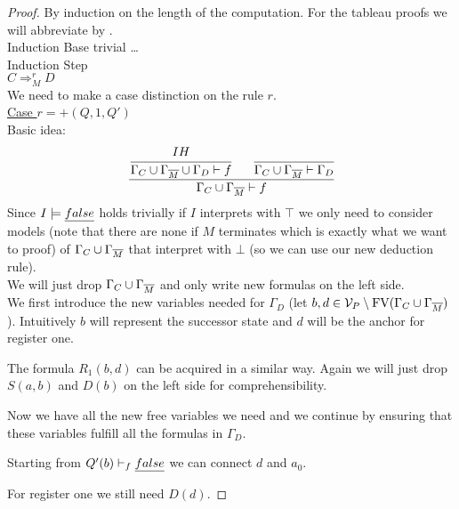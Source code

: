 \begin{proof} By induction on the length of the computation.
	For the tableau proofs we will abbreviate \false{} by \falses.\\
	Induction Base trivial \dots\\
	Induction Step\\
	$C\Rightarrow_M^r D$\\
	We need to make a case distinction on the rule $r$.\\
	\underline{Case $r=+(Q,1,Q')$}\\
	Basic idea:\\ %
	\[
		\cfrac
		{\cfrac{IH}{\Gamma_C\cup\Gamma_{\overline{M}}\cup\Gamma_D\vdash f}\hspace{0.6cm}
			\cfrac{}{\Gamma_C\cup\Gamma_{\overline{M}}\vdash\Gamma_D}}
		{\Gamma_C\cup\Gamma_{\overline{M}}\vdash f}
	\]
	Since $I\models\emph{false}$ holds trivially if $I$ interprets \false{} with $\top$ we only need to consider models (note that there are none if $M$ terminates which is exactly what we want to proof) of $\Gamma_C\cup\Gamma_{\overline{M}}$ that interpret \false{} with $\bot$ (so we can use our new deduction rule).\\
	We will just drop $\Gamma_C\cup\Gamma_{\overline{M}}$ and only write new formulas on the left side.\\
	We first introduce the new variables needed for $\Gamma_D$ (let $b,d\in \mathcal{V}_P\setminus\text{FV}(\Gamma_C\cup\Gamma_{\overline{M}})$). Intuitively $b$ will represent the successor state and $d$ will be the anchor for register one.
	
	\begin{figure}[H]
		
	\end{figure}
	The formula $R_1(b,d)$ can be acquired in a similar way. Again we will just drop $S(a,b)$ and $D(b)$ on the left side for comprehensibility.
	
	\begin{figure}[H]
		
	\end{figure}
	Now we have all the new free variables we need and we continue by ensuring that these variables fulfill all the formulas in $\Gamma_D$.
	
	\begin{figure}[H]
		
	\end{figure}
	Starting from $Q'(b)\vdash_f\emph{false}$ we can connect $d$ and $a_0$.
	
	\begin{figure}[H]
		
	\end{figure}
	For register one we still need $D(d)$.
	

\end{proof}
